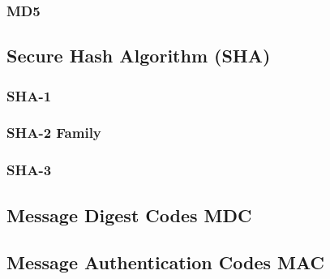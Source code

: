 \subsubsection{MD5}

\subsection{Secure Hash Algorithm (SHA)}

\subsubsection{SHA-1}

\subsubsection{SHA-2 Family}

\subsubsection{SHA-3}

\subsection{Message Digest Codes {MDC}}
\subsection{Message Authentication Codes {MAC}}
